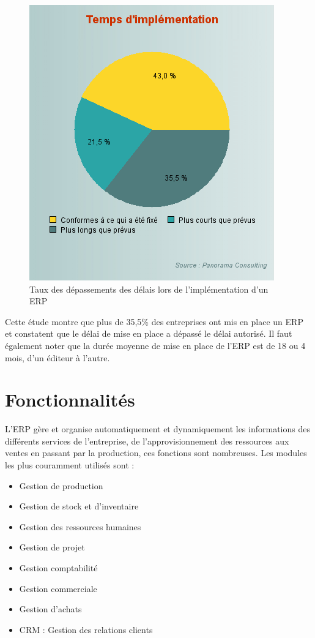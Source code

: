 \begin{figure}[H]
    \centering
    \includegraphics[scale=0.65]{ERP/graph-taux-implementation.png}
    \caption{Taux des dépassements des délais lors de l’implémentation d’un ERP}
\end{figure} 

Cette étude montre que plus de 35,5\% des entreprises ont mis en place un \acs{ERP} et constatent que le délai de mise en place a dépassé le délai autorisé. Il faut également noter que la durée moyenne de mise en place de l'\acs{ERP} est de 18 ou 4 mois, d'un éditeur à l'autre.\\

\section{Fonctionnalités}
L'ERP gère et organise automatiquement et dynamiquement les informations des différents services de l'entreprise, de l'approvisionnement des ressources aux ventes en passant par la production, ces fonctions\cite{funcs} sont nombreuses. Les modules les plus couramment utilisés sont :\\

\begin{itemize}
    \item Gestion de production
    \item Gestion de stock et d’inventaire
    \item Gestion des ressources humaines 
    \item Gestion de projet
    \item Gestion comptabilité
    \item Gestion commerciale
    \item Gestion d’achats
    \item CRM : Gestion des relations clients\\
\end{itemize}

